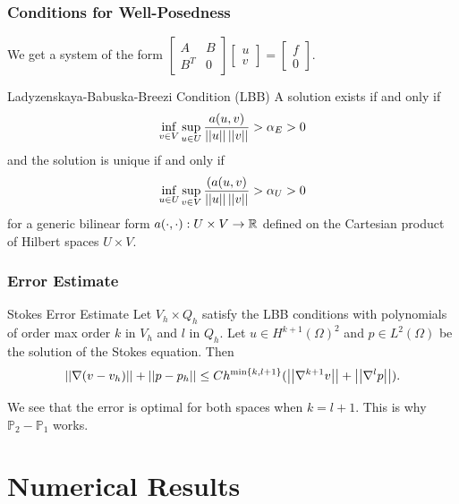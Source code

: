 \documentclass{beamer}
\begin{document}
\begin{frame}
    \frametitle{Conditions for Well-Posedness}
    We get a system of the form
    $\begin{bmatrix}
        A & B \\
        B^T & 0
    \end{bmatrix}
    \begin{bmatrix}
        u \\
        v
    \end{bmatrix}
    =
    \begin{bmatrix}
        f \\
        0
    \end{bmatrix}.$

    \begin{block}{Ladyzenskaya-Babuska-Breezi Condition (LBB)}
        A solution exists if and only if
        \[\inf_{v \in V} \sup_{u \in U} \frac{a(u, v)}{\left|\left|u\right|\right|\left|\left|v\right|\right|} >
            \alpha_E > 0 \]
        and the solution is unique if and only if \[\inf_{u
            \in U} \sup_{v \in V} \frac{(a(u, v)}{\left|\left|u\right|\right|\left|\left|v\right|\right|} > \alpha_U
            > 0 \]
        for a generic bilinear form $a(\cdot,\cdot): U \times V \to \mathbb{R}$ defined
        on the Cartesian product of Hilbert spaces $U \times V$.
    \end{block}

\end{frame}

\begin{frame}
    \frametitle{Error Estimate}
    \begin{block}{Stokes Error Estimate}
        Let $V_h \times Q_h$ satisfy the LBB conditions with polynomials of
        order max order $k$ in $V_h$ and $l$ in $Q_h$. Let $u \in
        H^{k+1}(\Omega)^2$ and $p \in L^2(\Omega)$ be the solution of the
        Stokes equation. Then
        \begin{equation}
            \left|\left|\nabla (v - v_h)\right|\right| + \left|\left|p - p_h\right|\right| \leq C h^{\min \{k, l+1\}}
            (\left|\left|\nabla^{k+1}v\right|\right| + \left|\left|\nabla^l p\right|\right|).
        \end{equation}
    \end{block}

    We see that the error is optimal for both spaces when $k = l + 1$. This is
    why $\mathbb{P}_2 - \mathbb{P}_1$ works.
\end{frame}


\section{Numerical Results}
\end{document}

